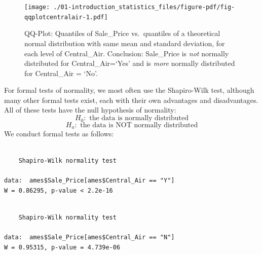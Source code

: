 \documentclass[
  letterpaper,
  DIV=11,
  numbers=noendperiod]{scrreprt}
\newenvironment{Shaded}{\begin{snugshade}}{\end{snugshade}}
\newcommand{\FunctionTok}[1]{\textcolor[rgb]{0.28,0.35,0.67}{#1}}
\newcommand{\NormalTok}[1]{\textcolor[rgb]{0.00,0.23,0.31}{#1}}
\newcommand{\SpecialCharTok}[1]{\textcolor[rgb]{0.37,0.37,0.37}{#1}}
\newcommand{\StringTok}[1]{\textcolor[rgb]{0.13,0.47,0.30}{#1}}
\begin{document}
\begin{figure}[H]

{\centering \texttt{[image: ./01-introduction\_statistics\_files/figure-pdf/fig-qqplotcentralair-1.pdf]}

}

\caption{\label{fig-qqplotcentralair}QQ-Plot: Quantiles of Sale\_Price
vs.~quantiles of a theoretical normal distribution with same mean and
standard deviation, for each level of Central\_Air. Conclusion:
Sale\_Price is \emph{not} normally distributed for Central\_Air=`Yes'
and is \emph{more} normally distributed for Central\_Air = `No'.}

\end{figure}

For formal tests of normality, we most often use the Shapiro-Wilk test,
although many other formal tests exist, each with their own advantages
and disadvantages. All of these tests have the null hypothesis of
normality: \[H_0: \text{ the data is normally distributed}\]
\[H_a: \text{ the data is NOT normally distributed}\] We conduct formal
tests as follows:

\begin{Shaded}
\end{Shaded}

\begin{verbatim}

    Shapiro-Wilk normality test

data:  ames$Sale_Price[ames$Central_Air == "Y"]
W = 0.86295, p-value < 2.2e-16
\end{verbatim}

\begin{Shaded}
\end{Shaded}

\begin{verbatim}

    Shapiro-Wilk normality test

data:  ames$Sale_Price[ames$Central_Air == "N"]
W = 0.95315, p-value = 4.739e-06
\end{verbatim}
\end{document}
